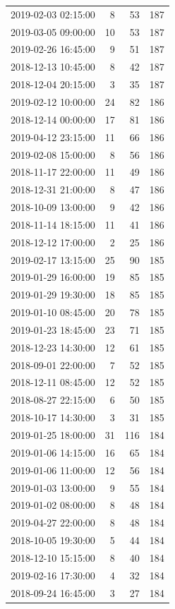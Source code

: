 \begin{tabular}{lrrr}
2019-02-03 02:15:00 & 8 & 53 & 187 \\
2019-03-05 09:00:00 & 10 & 53 & 187 \\
2019-02-26 16:45:00 & 9 & 51 & 187 \\
2018-12-13 10:45:00 & 8 & 42 & 187 \\
2018-12-04 20:15:00 & 3 & 35 & 187 \\
2019-02-12 10:00:00 & 24 & 82 & 186 \\
2018-12-14 00:00:00 & 17 & 81 & 186 \\
2019-04-12 23:15:00 & 11 & 66 & 186 \\
2019-02-08 15:00:00 & 8 & 56 & 186 \\
2018-11-17 22:00:00 & 11 & 49 & 186 \\
2018-12-31 21:00:00 & 8 & 47 & 186 \\
2018-10-09 13:00:00 & 9 & 42 & 186 \\
2018-11-14 18:15:00 & 11 & 41 & 186 \\
2018-12-12 17:00:00 & 2 & 25 & 186 \\
2019-02-17 13:15:00 & 25 & 90 & 185 \\
2019-01-29 16:00:00 & 19 & 85 & 185 \\
2019-01-29 19:30:00 & 18 & 85 & 185 \\
2019-01-10 08:45:00 & 20 & 78 & 185 \\
2019-01-23 18:45:00 & 23 & 71 & 185 \\
2018-12-23 14:30:00 & 12 & 61 & 185 \\
2018-09-01 22:00:00 & 7 & 52 & 185 \\
2018-12-11 08:45:00 & 12 & 52 & 185 \\
2018-08-27 22:15:00 & 6 & 50 & 185 \\
2018-10-17 14:30:00 & 3 & 31 & 185 \\
2019-01-25 18:00:00 & 31 & 116 & 184 \\
2019-01-06 14:15:00 & 16 & 65 & 184 \\
2019-01-06 11:00:00 & 12 & 56 & 184 \\
2019-01-03 13:00:00 & 9 & 55 & 184 \\
2019-01-02 08:00:00 & 8 & 48 & 184 \\
2019-04-27 22:00:00 & 8 & 48 & 184 \\
2018-10-05 19:30:00 & 5 & 44 & 184 \\
2018-12-10 15:15:00 & 8 & 40 & 184 \\
2019-02-16 17:30:00 & 4 & 32 & 184 \\
2018-09-24 16:45:00 & 3 & 27 & 184 \\

\end{tabular}
